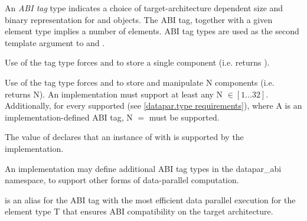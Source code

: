 \begin{itemdescr}
  \pnum
  An \emph{ABI tag} type indicates a choice of target-architecture dependent size and binary representation for \datapar and \mask objects.
  The ABI tag, together with a given element type implies a number of elements.
  ABI tag types are used as the second template argument to \datapar and \mask.

  \pnum
  Use of the  tag type forces \datapar and \mask to store a single component (i.e. \datapar{} returns ).

  \pnum\label{datapar.fixedsize.def}%
  Use of the \fixedsizeN tag type forces \datapar and \mask to store and manipulate \code N components (i.e. \datapar{} returns \code N).
  An implementation must support at least any \code N $\in [1\ldots 32]$.
  Additionally, for every supported \datapar[<T, A>] (see \ref{datapar.type requirements}), where \type A is an implementation-defined ABI tag, \code N $=$ \datapar[<T, A>::size()] must be supported.


  \pnum\label{datapar.maxfixedsize.def}%
  The value of  declares that an instance of  with  is supported by the implementation.

  \pnum
  An implementation may define additional ABI tag types in the datapar_abi namespace, to support other forms of data-parallel computation.

  \pnum
   is an alias for the ABI tag with the most efficient data parallel execution for the element type \type T that ensures ABI compatibility on the target architecture.


\end{itemdescr}
